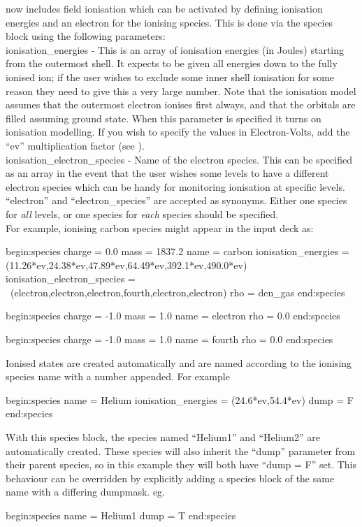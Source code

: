 {\EPOCH} now includes field ionisation which can be activated by defining
ionisation energies and an electron for the ionising species. This is done
via the species block using the following parameters:\\

{\emphtext ionisation\_energies} - This is an array of ionisation energies
  (in Joules) starting from the outermost shell. It expects to be given all
  energies down to the fully ionised ion; if the user wishes to exclude some
  inner shell ionisation for some reason they need to give this a very large
  number. Note that the ionisation model assumes that the outermost electron
  ionises first always, and that the orbitals are filled assuming ground
  state. When this parameter is specified it turns on ionisation modelling.
  If you wish to specify the values in Electron-Volts, add the ``ev''
  multiplication factor (see ).\\

{\emphtext ionisation\_electron\_species} - Name of the electron species. This
  can be specified as an array in the event that the user wishes some levels
  to have a different electron species which can be handy for monitoring
  ionisation at specific levels. ``electron'' and ``electron\_species'' are
  accepted as synonyms. Either one species for \emph{all} levels, or one species
  for \emph{each} species should be specified. \\

For example, ionising carbon species might appear in the input deck as:

\begin{boxverbatim}
begin:species
   charge = 0.0
   mass = 1837.2
   name = carbon
   ionisation_energies = (11.26*ev,24.38*ev,47.89*ev,64.49*ev,392.1*ev,490.0*ev)
   ionisation_electron_species = \
       (electron,electron,electron,fourth,electron,electron)
   rho = den_gas
end:species

begin:species
   charge = -1.0
   mass = 1.0
   name = electron
   rho = 0.0
end:species

begin:species
   charge = -1.0
   mass = 1.0
   name = fourth
   rho = 0.0
end:species
\end{boxverbatim}

Ionised states are created automatically and are named according to the ionising species name
with a number appended. For example
\begin{boxverbatim}
begin:species
   name = Helium
   ionisation_energies = (24.6*ev,54.4*ev)
   dump = F
end:species
\end{boxverbatim}
With this species block, the species named ``Helium1'' and ``Helium2''
are automatically created. These species will also inherit the ``dump''
parameter from their parent species, so in this example they will both have
``dump = F'' set. This behaviour can be overridden by explicitly
adding a species block of the same name with a differing dumpmask.
eg.
\begin{boxverbatim}
begin:species
   name = Helium1
   dump = T
end:species
\end{boxverbatim}


